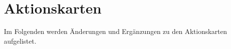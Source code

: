 \section{Aktionskarten}

Im Folgenden werden Änderungen und Ergänzungen zu den Aktionskarten aufgelistet.

% 
% 
% 



